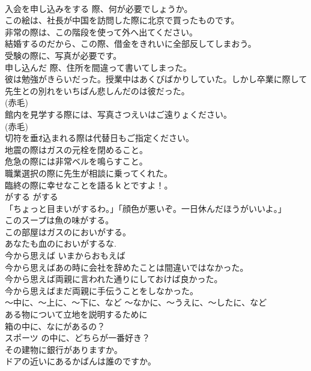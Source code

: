 \documentclass[8pt]{extreport}
\begin{document}
\begin{CJK}{UTF8}{min}
\\	入会を申し込みをする 際、何が必要でしょうか。  
\\	この絵は、社長が中国を訪問した際に北京で買ったものです。   
\\	非常の際は、この階段を使って外へ出てください。   
\\	結婚するのだから、この際、借金をきれいに全部反してしまおう。  
\\	受験の際に、写真が必要です。   
\\	申し込んだ 際、住所を間違って書いてしまった。  
\\	彼は勉強がきらいだった。授業中はあくびばかりしていた。しかし卒業に際して先生との別れをいちばん悲しんだのは彼だった。  
\\	(赤毛)
\\	館内を見学する際には、写真さつえいはご遠りょください。  
\\	(赤毛)
\\	切符を垂ｵ込まれる際は代替日もご指定ください。   
\\	地震の際はガスの元栓を閉めること。   
\\	危急の際には非常ベルを鳴らすこと。   
\\	職業選択の際に先生が相談に乗ってくれた。   
\\	臨終の際に幸せなことを語るｋとですよ！。  
\\	がする	がする	
\\	「ちょっと目まいがするわ。」「顔色が悪いぞ。一日休んだほうがいいよ。」  
\\	このスープは魚の味がする。  
\\	この部屋はガスのにおいがする。  
\\	あなたも血のにおいがするな.  
\\	今から思えば	いまからおもえば	
\\	今から思えばあの時に会社を辞めたことは間違いではなかった。  
\\	今から思えば両親に言われた通りにしておけば良かった。  
\\	今から思えばまだ両親に手伝うことをしなかった。  
\\	〜中に、〜上に、〜下に、など	〜なかに、〜うえに、〜したに、など	
\\	ある物について立地を説明するために	
\\	箱の中に、なにがあるの？ 
\\	スポーツ の中に、どちらが一番好き？  
\\	その建物に銀行がありますか｡   
\\	ドアの近いにあるかばんは誰のですか｡   

\end{CJK}
\end{document}
